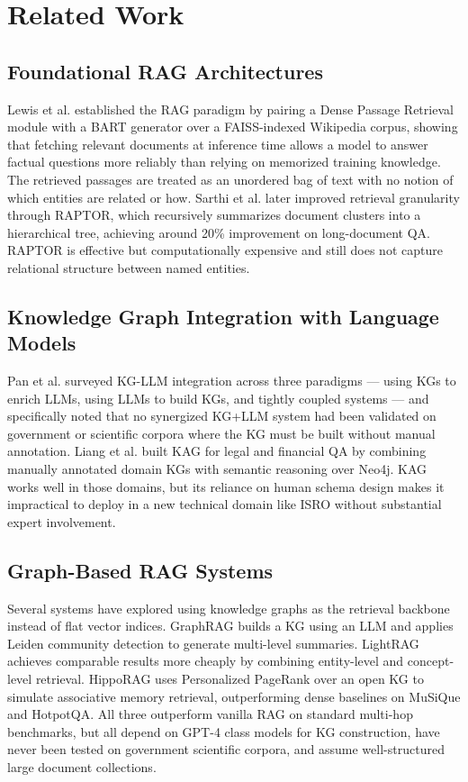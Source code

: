 \documentclass[conference]{IEEEtran}
\begin{document}
\section{Related Work}
\label{sec:related}

\subsection{Foundational RAG Architectures}

Lewis et al. \cite{lewis2020rag} established the RAG paradigm by pairing a Dense Passage Retrieval module with a BART generator over a FAISS-indexed Wikipedia corpus, showing that fetching relevant documents at inference time allows a model to answer factual questions more reliably than relying on memorized training knowledge. The retrieved passages are treated as an unordered bag of text with no notion of which entities are related or how. Sarthi et al. \cite{sarthi2024raptor} later improved retrieval granularity through RAPTOR, which recursively summarizes document clusters into a hierarchical tree, achieving around 20\% improvement on long-document QA. RAPTOR is effective but computationally expensive and still does not capture relational structure between named entities.

\subsection{Knowledge Graph Integration with Language Models}

Pan et al. \cite{pan2024unifying} surveyed KG-LLM integration across three paradigms — using KGs to enrich LLMs, using LLMs to build KGs, and tightly coupled systems — and specifically noted that no synergized KG+LLM system had been validated on government or scientific corpora where the KG must be built without manual annotation. Liang et al. \cite{liang2024kag} built KAG for legal and financial QA by combining manually annotated domain KGs with semantic reasoning over Neo4j. KAG works well in those domains, but its reliance on human schema design makes it impractical to deploy in a new technical domain like ISRO without substantial expert involvement.

\subsection{Graph-Based RAG Systems}

Several systems have explored using knowledge graphs as the retrieval backbone instead of flat vector indices. GraphRAG \cite{edge2024graphrag} builds a KG using an LLM and applies Leiden community detection to generate multi-level summaries. LightRAG \cite{guo2024lightrag} achieves comparable results more cheaply by combining entity-level and concept-level retrieval. HippoRAG \cite{gutierrez2024hipporag} uses Personalized PageRank over an open KG to simulate associative memory retrieval, outperforming dense baselines on MuSiQue and HotpotQA. All three outperform vanilla RAG on standard multi-hop benchmarks, but all depend on GPT-4 class models for KG construction, have never been tested on government scientific corpora, and assume well-structured large document collections.
\end{document}
